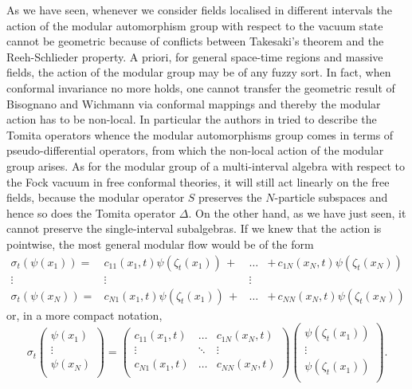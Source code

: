  \bigskip
 As we have seen, whenever
 we consider fields localised in different intervals the action
 of the modular automorphism group with respect to the vacuum state
 cannot be geometric because of conflicts between Takesaki's
 theorem and the Reeh-Schlieder property.
 A priori, for general space-time regions and massive fields, 
 the action of the modular group may be of any fuzzy sort.
 In fact, when conformal invariance no more holds, one cannot 
 transfer the geometric result of Bisognano and Wichmann via 
 conformal mappings and thereby the modular action has to be
 non-local. In particular the authors in \cite{Saf:2006, FigGui:1989} 
 tried to describe the Tomita operators whence the modular 
 automorphisms group comes in terms of pseudo-differential 
 operators, from which the non-local action of the modular 
 group arises. As for the modular group of a multi-interval 
 algebra with respect to the Fock vacuum in free conformal 
 theories, it will still act linearly on the free fields, 
 because the modular operator $S$ preserves the $N$-particle 
 subspaces and hence so does the Tomita operator $\Delta$.
 On the other hand, as we have just seen, it cannot preserve the
 single-interval subalgebras. If we knew that the action is pointwise,
 the most general modular flow would be of the form
 \begin{equation}
 \label{CHmatrix}
  \begin{matrix}
  \sigma_t(\psi(x_1))=&c_{11}(x_1,t)\psi(\zeta_t(x_1))\,+
                     &\ldots&+\,c_{1N}(x_N,t)\psi(\zeta_t(x_N))\\
  \vdots&\vdots&\vdots\\  
  \sigma_t(\psi(x_N))=&c_{N1}(x_1,t)\psi(\zeta_t(x_1))\,+
                      &\ldots&+\,c_{NN}(x_N,t)\psi(\zeta_t(x_N))
  \end{matrix}
 \end{equation}
 or, in a more compact notation,
 \begin{equation}
 \sigma_t \begin{pmatrix}
          \psi(x_1)\\
          \vdots\\
          \psi(x_N)\\
          \end{pmatrix}
 =        \begin{pmatrix}
          c_{11}(x_1,t)&\ldots& c_{1N}(x_N,t)\\
          \vdots&\ddots&\vdots\\
          c_{N1}(x_1,t)&\ldots& c_{NN}(x_N,t)\\
          \end{pmatrix} 
          \begin{pmatrix}
          \psi(\zeta_t(x_1))\\
          \vdots\\
          \psi(\zeta_t(x_1))\\
          \end{pmatrix}.
 \end{equation}
